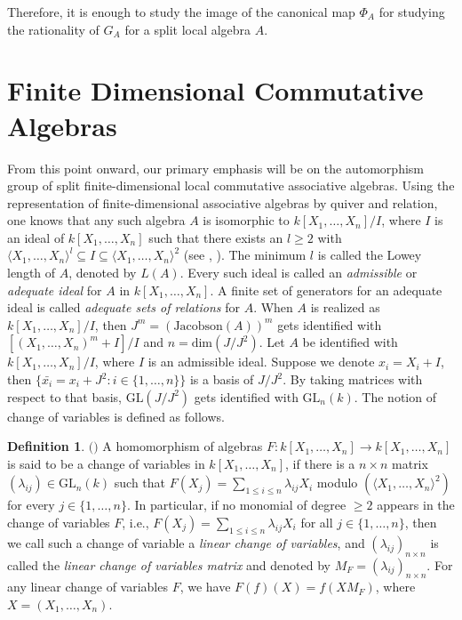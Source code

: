 \documentclass[12pt]{amsart}
\theoremstyle{definition}
\newtheorem{definition}[theorem]{Definition}
\numberwithin{equation}{section}
\begin{document}
\vskip2mm 
\noindent
Therefore, it is enough to study the image of the canonical map $\Phi_A$ for studying the rationality of $G_A$ for a split local algebra $A$.

\section{Finite Dimensional Commutative Algebras}\label{sec: commutative algebra}

\vskip2mm
\noindent
From this point onward, our primary emphasis will be on the automorphism group of split finite-dimensional local commutative associative algebras. Using the representation of finite-dimensional associative algebras by quiver and relation, one knows that any such algebra $A$ is isomorphic to $k[X_1,\dots, X_n]/{I}$, where $I$ is an ideal of $k[X_1,\dots, X_n]$ such that there exists an $l\geq2$ with $\langle X_1,\dots, X_n \rangle^l \subseteq I \subseteq \langle X_1,\dots, X_n \rangle^2$ (see \cite{AS1}, \cite{PG}). The minimum $l$ is called the Lowey length of $A$, denoted by $L(A)$. Every such ideal is called an \emph{admissible} or \emph{adequate ideal} for $A$ in $k[X_1,\dots,X_n]$. A finite set of generators for an adequate ideal is called \emph{adequate sets of relations} for $A$. When $A$ is realized as $k[X_1,\dots,X_n]/I$, then $J^m=(\text{Jacobson}(A))^m$ gets identified with $[(X_1,\dots,X_n)^m+I]/I$ and $n = \text{dim}(J/J^2)$. Let $A$ be identified with $k[X_1,\dots,X_n]/I$, where $I$ is an admissible ideal. Suppose we denote $x_i=X_i+I$, then $\{\bar{x_{i}}=x_i+J^2:i\in\{1,\dots,n\}\}$ is a basis of $J/J^2$. By taking matrices with respect to that basis, $\text{GL}(J/J^2)$ gets identified with $\text{GL}_n(k)$. The notion of change of variables is defined as follows.

\vskip1mm

\begin{definition}\label{Definition 5.1}$($\cite{AS1}$)$
A homomorphism of algebras $F:k[X_1,\dots,X_n]\longrightarrow k[X_1,\dots,X_n]$ is said to be a change of variables in $k[X_1,\dots,X_n]$, if there is a $n\times n$ matrix $(\lambda_{ij})\in \text{GL}_{n}(k)$ such that $F(X_j)=\sum_{1\leq i\leq n}\lambda_{ij}X_i$ modulo $(\langle X_1,\dots,X_n\rangle^2)$ for every $j\in \{1,\dots,n\}$. In particular, if no monomial of degree $\geq 2$ appears in the change of variables $F$, i.e., $F(X_j)=\sum_{1\leq i\leq n}\lambda_{ij}X_i$ for all $j\in\{1,\dots,n\}$, then we call such a change of variable a \emph{linear change of variables}, and $(\lambda_{ij})_{n\times n}$ is called the \emph{linear change of variables matrix} and denoted by $M_{F}=(\lambda_{ij})_{n\times n}$. For any linear change of variables $F$, we have $F(f)(X)=f(XM_{F})$, where $X=(X_1,\dots,X_n)$.
\end{definition}
\end{document}
